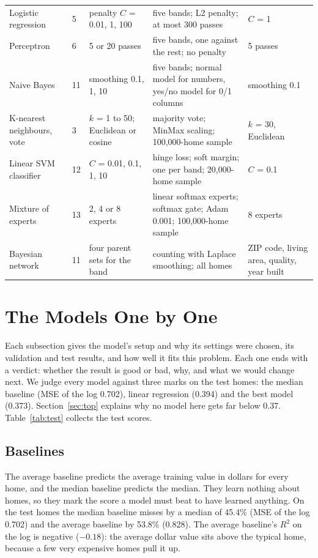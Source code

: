 \documentclass[sigconf,nonacm,10pt]{acmart}
\begin{document}
\begin{table}[t]
\begin{tabularx}{\textwidth}{@{}L{2.6cm}L{0.9cm}YYL{3.1cm}@{}}
Logistic regression & 5 & penalty $C$ = 0.01, 1, 100 & five bands; L2 penalty; at most 300 passes & $C$ = 1 \\
Perceptron & 6 & 5 or 20 passes & five bands, one against the rest; no penalty & 5 passes \\
Naive Bayes & 11 & smoothing 0.1, 1, 10 & five bands; normal model for numbers, yes/no model for 0/1 columns & smoothing 0.1 \\
K-nearest neighbours, vote & 3 & $k$ = 1 to 50; Euclidean or cosine & majority vote; MinMax scaling; 100,000-home sample & $k$ = 30, Euclidean \\
Linear SVM classifier & 12 & $C$ = 0.01, 0.1, 1, 10 & hinge loss; soft margin; one per band; 20,000-home sample & $C$ = 0.1 \\
Mixture of experts & 13 & 2, 4 or 8 experts & linear softmax experts; softmax gate; Adam 0.001; 100,000-home sample & 8 experts \\
Bayesian network & 11 & four parent sets for the band & counting with Laplace smoothing; all homes & ZIP code, living area, quality, year built \\
\bottomrule
\end{tabularx}
\end{table}

\section{The Models One by One}
\label{sec:models}

Each subsection gives the model's setup and why its settings were chosen, its validation and test results, and how well it fits this problem. Each one ends with a verdict: whether the result is good or bad, why, and what we would change next. We judge every model against three marks on the test homes: the median baseline (MSE of the log 0.702), linear regression (0.394) and the best model (0.373). Section~\ref{sec:top} explains why no model here gets far below 0.37. Table~\ref{tab:test} collects the test scores.

\subsection{Baselines}
The average baseline predicts the average training value in dollars for every home, and the median baseline predicts the median. They learn nothing about homes, so they mark the score a model must beat to have learned anything. On the test homes the median baseline misses by a median of 45.4\% (MSE of the log 0.702) and the average baseline by 53.8\% (0.828). The average baseline's $R^2$ on the log is negative ($-0.18$): the average dollar value sits above the typical home, because a few very expensive homes pull it up.
\end{document}
